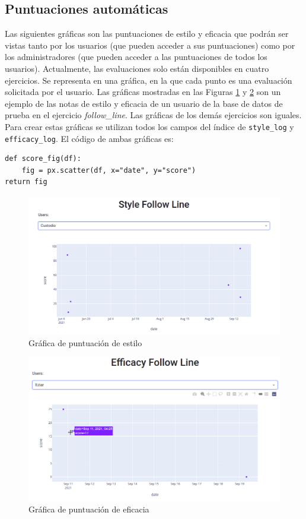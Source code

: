 \subsection{Puntuaciones automáticas}
Las siguientes gráficas son las puntuaciones de estilo y eficacia que podrán ser vistas tanto por los usuarios (que pueden acceder a sus puntuaciones) como por los administradores (que pueden acceder a las puntuaciones de todos los usuarios).  Actualmente, las evaluaciones solo están disponibles en cuatro ejercicios. Se representa en una gráfica, en la que cada punto es una evaluación solicitada por el usuario. Las gráficas mostradas en las Figuras \ref{fig:score} y \ref{fig:score_efficacy}  son un ejemplo de las notas de estilo y eficacia de un usuario de la base de datos de prueba en el ejercicio \textit{follow\_line}. Las gráficas de los demás ejercicios son iguales. Para crear estas gráficas se utilizan todos los campos del índice de \texttt{style\_log} y \texttt{efficacy\_log}. El código de ambas gráficas es:
\begin{verbatim}
def score_fig(df):
    fig = px.scatter(df, x="date", y="score")
return fig
\end{verbatim}




\begin{figure}[H]
    \centering
    \includegraphics[width=17cm, keepaspectratio]{img/score.png}
    \caption{Gráfica de puntuación de estilo}
    \label{fig:score}
\end{figure}


\begin{figure}[H]
    \centering
    \includegraphics[width=17cm, keepaspectratio]{img/score_efficacy.png}
    \caption{Gráfica de puntuación de eficacia}
    \label{fig:score_efficacy}
\end{figure}





